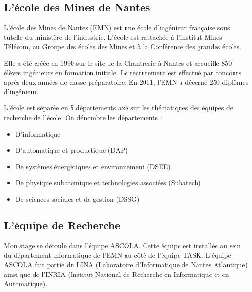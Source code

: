 \documentclass[a4paper, 11pt]{report}
\begin{document}
		\subsection{L'école des Mines de Nantes}
L’école des Mines de Nantes (EMN) est une école d’ingénieur française sous tutelle du ministère de l’industrie. L’école est rattachée à l’institut Mines-Télécom, au Groupe des écoles des Mines et à la Conférence des grandes écoles.

Elle a été créée en 1990 sur le site de la Chantrerie à Nantes et accueille 850 élèves ingénieurs en formation initiale. Le recrutement est effectué par concours après deux années de classe préparatoire. En 2011, l’EMN a décerné 250 diplômes d’ingénieur.

L’école est séparée en 5 départements axé sur les thématiques des équipes de recherche de l'école. On dénombre les départements :
\begin{itemize}
	\item D'informatique
	\item D'automatique et productique (DAP)
	\item De systèmes énergétiques et environnement (DSEE)
	\item De physique subatomique et technologies associées (Subatech)
	\item De sciences sociales et de gestion (DSSG)
\end{itemize}

		\subsection{L'équipe de Recherche}
Mon stage se déroule dans l'équipe ASCOLA. Cette équipe est installée au sein du département informatique de l’EMN au côté de l'équipe TASK. L'équipe ASCOLA fait partie du LINA (Laboratoire d'Informatique de Nantes Atlantique) ainsi que de l'INRIA (Institut National de Recherche en Informatique et en Automatique).
\end{document}
